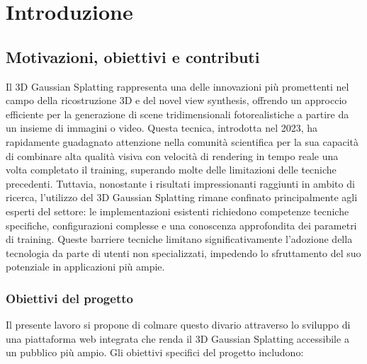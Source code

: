 \chapter*{Introduzione}

\section*{Motivazioni, obiettivi e contributi}
Il 3D Gaussian Splatting rappresenta una delle innovazioni più promettenti nel campo della ricostruzione 3D e del novel view synthesis, offrendo un approccio efficiente per la generazione di scene tridimensionali fotorealistiche a partire da un insieme di immagini o video. Questa tecnica, introdotta nel 2023, ha rapidamente guadagnato attenzione nella comunità scientifica per la sua capacità di combinare alta qualità visiva con velocità di rendering in tempo reale una volta completato il training, superando molte delle limitazioni delle tecniche precedenti.
Tuttavia, nonostante i risultati impressionanti raggiunti in ambito di ricerca, l'utilizzo del 3D Gaussian Splatting rimane confinato principalmente agli esperti del settore: le implementazioni esistenti richiedono competenze tecniche specifiche, configurazioni complesse e una conoscenza approfondita dei parametri di training. Queste barriere tecniche limitano significativamente l'adozione della tecnologia da parte di utenti non specializzati, impedendo lo sfruttamento del suo potenziale in applicazioni più ampie.

\subsection*{Obiettivi del progetto}
Il presente lavoro si propone di colmare questo divario attraverso lo sviluppo di una piattaforma web integrata che renda il 3D Gaussian Splatting accessibile a un pubblico più ampio.
Gli obiettivi specifici del progetto includono:

